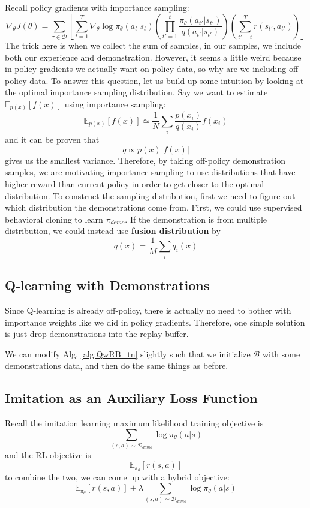 Recall policy gradients with importance sampling:
\[
\nabla_\theta J(\theta) = \sum_{\tau\in\mathcal{D}}\left[\sum_{t=1}^T\nabla_\theta\log\pi_\theta(a_t|s_t)\left(\prod_{t'=1}^t\frac{\pi_\theta(a_{t'}|s_{t'})}{q(a_{t'}|s_{t'})}\right)\left(\sum_{t'=t}^Tr(s_{t'},a_{t'})\right)\right]
\]
The trick here is when we collect the sum of samples, in our samples, we include both our experience and demonstration. However, it seems a little weird because in policy gradients we actually want on-policy data, so why are we including off-policy data. To answer this question, let us build up some intuition by looking at the optimal importance sampling distribution. Say we want to estimate $\mathbb{E}_{p(x)}[f(x)]$ using importance sampling:
\[
\mathbb{E}_{p(x)}[f(x)] \simeq \frac{1}{N} \sum_i\frac{p(x_i)}{q(x_i)}f(x_i)
\]
and it can be proven that
\[
q\propto p(x)|f(x)|
\]
gives us the smallest variance. Therefore, by taking off-policy demonstration samples, we are motivating importance sampling to use distributions that have higher reward than current policy in order to get closer to the optimal distribution.
To construct the sampling distribution, first we need to figure out which distribution the demonstrations come from. First, we could use supervised behavioral cloning to learn $\pi_{demo}$. If the demonstration is from multiple distribution, we could instead use \textbf{fusion distribution} by
\[
q(x) = \frac{1}{M}\sum_i q_i(x)
\]

\subsection{Q-learning with Demonstrations}
Since Q-learning is already off-policy, there is actually no need to bother with importance weights like we did in policy gradients. Therefore, one simple solution is just drop demonstrations into the replay buffer.

We can modify Alg. \ref{alg:QwRB_tn} slightly such that we initialize $\mathcal{B}$ with some demonstrations data, and then do the same things as before.

\subsection{Imitation as an Auxiliary Loss Function}
Recall the imitation learning maximum likelihood training objective is 
\[
\sum_{(s,a)\sim\mathcal{D}_{demo}}\log \pi_\theta(a|s)
\]
and the RL objective is
\[
\mathbb{E}_{\pi_\theta}[r(s,a)]
\]
to combine the two, we can come up with a hybrid objective:
\[
\mathbb{E}_{\pi_\theta}[r(s,a)] + \lambda \sum_{(s,a)\sim\mathcal{D}_{demo}}\log \pi_\theta(a|s)
\]
